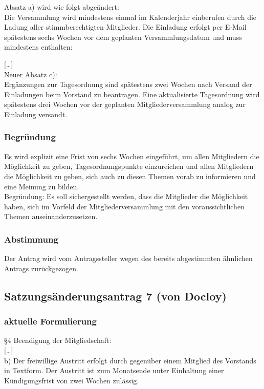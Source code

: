 \documentclass[a4paper]{scrartcl}
\begin{document}
Absatz a) wird wie folgt abgeändert:\\
Die Versammlung wird mindestens einmal im Kalenderjahr einberufen durch die Ladung aller stimmberechtigten Mitglieder. Die Einladung erfolgt per
E-Mail spätestens sechs Wochen vor dem geplanten Versammlungsdatum und muss mindestens enthalten:

{[}\dots{]}\\

Neuer Absatz c):\\
Ergänzungen zur Tagesordnung sind spätestens zwei Wochen nach Versand der Einladungen beim Vorstand zu beantragen. Eine aktualisierte
Tagesordnung wird spätestens drei Wochen vor der geplanten Mitgliederversammlung analog zur Einladung versandt.

\subsubsection{Begründung}

Es wird explizit eine Frist von sechs Wochen eingeführt, um allen Mitgliedern die Möglichkeit zu geben, Tagesordnungspunkte
einzureichen und allen Mitgliedern die Möglichkeit zu geben, sich auch zu diesen Themen vorab zu informieren und eine Meinung zu bilden.\\

Begründung: Es soll sichergestellt werden, dass die Mitglieder die Möglichkeit haben, sich im Vorfeld der Mitgliederversammlung mit den voraussichtlichen Themen auseinanderzusetzen.\\


\subsubsection{Abstimmung}

Der Antrag wird vom Antragssteller wegen des bereits abgestimmten ähnlichen Antrags zurückgezogen.

\subsection{Satzungsänderungsantrag 7 (von Docloy)}
\subsubsection{aktuelle Formulierung}

§4 Beendigung der Mitgliedschaft:\\
{[}\dots{]}\\
b) Der freiwillige Austritt erfolgt durch gegenüber einem Mitglied des Vorstands in Textform. Der Austritt ist zum Monatsende unter Einhaltung einer Kündigungsfrist von zwei Wochen zulässig.
\end{document}

